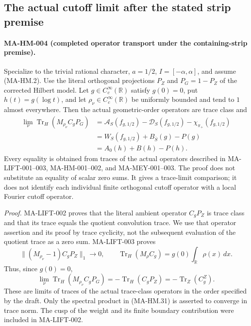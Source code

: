 \subsection{The actual cutoff limit after the stated strip premise}

\paragraph{MA-HM-004 (completed operator transport under the containing-strip premise).}
Specialize to the trivial rational character, $a=1/2$,
$I=[-\alpha,\alpha]$, and assume (MA-HM.2).
Use the literal orthogonal projections $P_Z$ and
$P_G=1-P_Z$ of the corrected Hilbert model.
Let $g\in C_c^\infty(\mathbb R)$ satisfy $g(0)=0$,
put $h(t)=g(\log t)$, and let
$\rho_\nu\in C_c^\infty(\mathbb R)$ be uniformly
bounded and tend to $1$ almost everywhere.
Then the actual geometric-order operators are
trace class and
\[
 \begin{aligned}
 \lim_\nu\operatorname{Tr}_{H}
                  (M_{\rho_\nu}C_gP_G)
   &=\mathcal A_S(f_{g,1/2})
          -\mathcal D_S(f_{g,1/2})
          -\chi_{\pi_+}(f_{g,1/2})\\
   &=W_S(f_{g,1/2})+B_{\overline S}(g)-P(g)\\
   &=A_0(h)+B(h)-P(h).
 \end{aligned}
 \tag{MA-HM.30}
\]
Every equality is obtained from traces of the actual
operators described in MA-LIFT-001--003,
MA-HM-001--002, and MA-MEY-001--003.
The proof does not substitute an equality of scalar
zero sums.  It gives a trace-limit comparison;
it does not identify each individual finite
orthogonal cutoff operator with a local Fourier
cutoff operator.

\emph{Proof.}
MA-LIFT-002 proves that the literal ambient operator
$C_gP_Z$ is trace class and that its trace equals
the quotient convolution trace.  We use that
operator assertion and its proof by trace cyclicity,
not the subsequent evaluation of the quotient
trace as a zero sum.  MA-LIFT-003 proves
\[
 \|(M_{\rho_\nu}-1)C_gP_Z\|_1\longrightarrow0,
 \qquad
 \operatorname{Tr}_{H}(M_\rho C_g)
                         =g(0)\int_{\mathbb R}\rho(x)\,dx.
 \tag{MA-HM.31}
\]
Thus, since $g(0)=0$,
\[
 \lim_\nu\operatorname{Tr}_{H}
                  (M_{\rho_\nu}C_gP_G)
       =-\operatorname{Tr}_{H}(C_gP_Z)
       =-\operatorname{Tr}_{Z}(C_g^Z).
 \tag{MA-HM.32}
\]
These are limits of traces of the actual trace-class
operators in the order specified by the draft.
Only the spectral product in (MA-HM.31) is asserted
to converge in trace norm.  The cusp of the
weight and its finite boundary contribution were
included in MA-LIFT-002.

